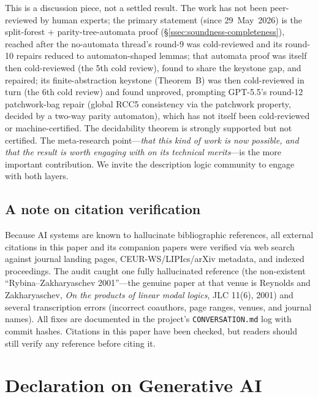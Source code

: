 \documentclass[
]{ceurart}
\theoremstyle{definition}
\begin{document}
This is a discussion piece, not a settled result.  The work has
not been peer-reviewed by human experts; the primary statement (since 29~May~2026) is the split-forest $+$
parity-tree-automata proof (\S\ref{ssec:soundness-completeness}),
reached after the no-automata thread's round-9 was cold-reviewed and
its round-10 repairs reduced to automaton-shaped lemmas; that automata
proof was itself then cold-reviewed (the 5th cold review), found to
share the keystone gap, and repaired; its finite-abstraction keystone
(Theorem~B) was then cold-reviewed in turn (the 6th cold review) and
found unproved, prompting GPT-5.5's round-12 patchwork-bag repair
(global RCC5 consistency via the patchwork property, decided by a
two-way parity automaton), which has not itself been cold-reviewed or
machine-certified.  The
decidability theorem is strongly supported but not certified.  The meta-research point---\emph{that this kind
of work is now possible, and that the result is worth engaging
with on its technical merits}---is the more important
contribution.  We invite the description logic community to engage
with both layers.

\subsection{A note on citation verification}

Because AI systems are known to hallucinate bibliographic references,
all external citations in this paper and its companion papers were
verified via web search against journal landing pages,
CEUR-WS/LIPIcs/arXiv metadata, and indexed proceedings.  The audit
caught one fully hallucinated reference (the non-existent
``Rybina--Zakharyaschev 2001''---the genuine paper at that venue is
Reynolds and Zakharyaschev, \emph{On the products of linear modal
logics}, JLC 11(6), 2001) and several transcription errors
(incorrect coauthors, page ranges, venues, and journal names).  All
fixes are documented in the project's \texttt{CONVERSATION.md} log
with commit hashes.  Citations in this paper have been checked, but
readers should still verify any reference before citing it.

\section*{Declaration on Generative AI}
\end{document}
